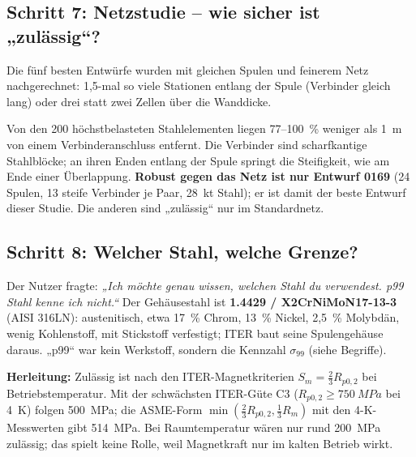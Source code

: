 \subsection*{Schritt 7: Netzstudie -- wie sicher ist „zulässig“?}
Die fünf besten Entwürfe wurden mit gleichen Spulen und feinerem Netz nachgerechnet: 1,5-mal so viele Stationen
entlang der Spule (Verbinder gleich lang) oder drei statt zwei Zellen über die Wanddicke.
\begin{table}[H]\centering\small\caption{Netzstudie: $\sigma_{99}$ und
größter Elementwert im Stahl (MPa).}\end{table}
Von den 200 höchstbelasteten Stahlelementen liegen 77--100~\% weniger als \SI{1}{m} von einem Verbinderanschluss
entfernt. Die Verbinder sind scharfkantige Stahlblöcke; an ihren Enden entlang der Spule springt die Steifigkeit, wie
am Ende einer Überlappung. \textbf{Robust gegen das Netz ist nur Entwurf 0169} (24 Spulen, 13 steife Verbinder je
Paar, \SI{28}{kt} Stahl); er ist damit der beste Entwurf dieser Studie. Die anderen sind „zulässig“ nur im
Standardnetz.

\subsection*{Schritt 8: Welcher Stahl, welche Grenze?}\label{sec:stahl}
Der Nutzer fragte: \emph{„Ich möchte genau wissen, welchen Stahl du verwendest. p99 Stahl kenne ich nicht.“} Der
Gehäusestahl ist \textbf{1.4429 / X2CrNiMoN17-13-3} (AISI 316LN): austenitisch, etwa 17~\% Chrom, 13~\% Nickel,
2,5~\% Molybdän, wenig Kohlenstoff, mit Stickstoff verfestigt; ITER baut seine Spulengehäuse daraus. „p99“ war kein
Werkstoff, sondern die Kennzahl $\sigma_{99}$ (siehe Begriffe).

\textbf{Herleitung:} Zulässig ist nach den ITER-Magnetkriterien $S_m=\tfrac23R_{p0,2}$ bei Betriebstemperatur. Mit
der schwächsten ITER-Güte C3 ($R_{p0,2}\ge\SI{750}{MPa}$ bei \SI{4}{K}) folgen \SI{500}{MPa}; die ASME-Form
$\min(\tfrac23R_{p0,2},\tfrac13R_m)$ mit den 4-K-Messwerten gibt \SI{514}{MPa}. Bei Raumtemperatur wären nur rund
\SI{200}{MPa} zulässig; das spielt keine Rolle, weil Magnetkraft nur im kalten Betrieb wirkt.

